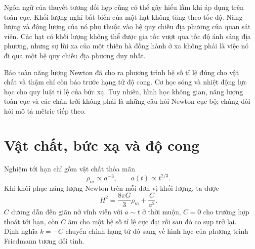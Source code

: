 Ngôn ngữ của thuyết tương đối hẹp cũng có thể gây hiểu lầm khi áp dụng trên toàn cục. Khối lượng nghỉ bất biến của một hạt không tăng theo tốc độ. Năng lượng và động lượng của nó phụ thuộc vào hệ quy chiếu địa phương của quan sát viên. Các hạt có khối lượng không thể được gia tốc vượt qua tốc độ ánh sáng địa phương, nhưng sự lùi xa của một thiên hà đồng hành ở xa không phải là việc nó đi qua một hệ quy chiếu địa phương duy nhất.

\begin{classroomqa}
\end{classroomqa}

\begin{classroomqa}
\end{classroomqa}

Bảo toàn năng lượng Newton đã cho ra phương trình hệ số tỉ lệ đúng cho vật chất và thậm chí còn báo trước hạng tử độ cong. Cơ học sóng và nhiệt động lực học cho quy luật tỉ lệ của bức xạ. Tuy nhiên, hình học không gian, năng lượng toàn cục và các chân trời không phải là những câu hỏi Newton cục bộ; chúng đòi hỏi mô tả mêtric tiếp theo.

\section{Vật chất, bức xạ và độ cong}

Nghiệm tới hạn chỉ gồm vật chất thỏa mãn
\begin{equation}
\rho_m\propto a^{-3},
\qquad
a(t)\propto t^{2/3}.
\end{equation}
Khi khôi phục năng lượng Newton trên mỗi đơn vị khối lượng, ta được
\begin{equation}
H^2=\frac{8\pi G}{3}\rho_m+\frac{C}{a^2}.
\end{equation}
\(C\) dương dẫn đến giãn nở vĩnh viễn với \(a\sim t\) ở thời muộn, \(C=0\) cho trường hợp thoát tới hạn, còn \(C\) âm cho một hệ số tỉ lệ cực đại rồi sau đó co sụp trở lại. Định nghĩa \(k=-C\) chuyển chính hạng tử đó sang vế hình học của phương trình Friedmann tương đối tính.

